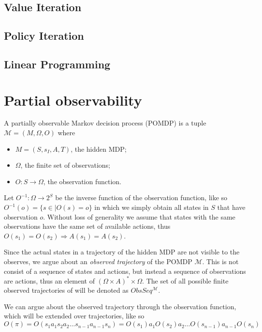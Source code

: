 \subsection*{Value Iteration}

\subsection*{Policy Iteration}

\subsection*{Linear Programming}

\section{Partial observability}

\begin{definition}[POMDP]
	A partially observable Markov decision process (POMDP) is a tuple $\mathcal{M}=(M, \Omega, O)$ where 
	\begin{itemize}
		\item $M=(S,s_I,A,T)$, the hidden MDP;
		\item $\Omega$, the finite set of observations;
		\item $O:S\to \Omega$, the observation function. %
	\end{itemize}
\end{definition}

Let $O^{-1}:\Omega\to 2^S$ be the inverse function of the observation function, like so $O^{-1}(o)=\{s\in \mid O(s)=o\}$ in which we simply obtain all states in $S$ that have observation $o$.
Without loss of generality we assume that states with the same observations have the same set of available actions, thus $O(s_1)=O(s_2)\Rightarrow A(s_1)=A(s_2)$.

Since the actual states in a trajectory of the hidden MDP are not visible to the observes, we argue about an \textit{observed trajectory} of the POMDP $\mathcal{M}$. This is not consist of a sequence of states and actions, but instead a sequence of observations are actions, thus an element of $(\Omega\times A)^*\times \Omega$. The set of all possible finite observed trajectories of will be denoted as $ObsSeq^{\mathcal{M}}$.

We can argue about the observed trajectory through the observation function, which will be extended over trajectories, like so
\[O(\pi)=O(s_1 a_1 s_2 a_2\dots s_{n-1} a_{n-1} s_n) = O(s_1) a_1 O(s_2) a_2\dots O(s_{n-1}) a_{n-1} O(s_n)\]

